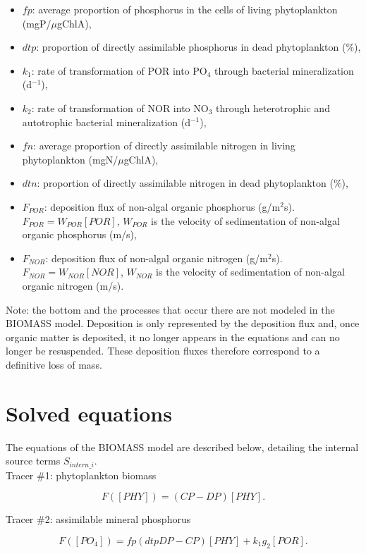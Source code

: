 \begin{itemize}
\item $fp$: average proportion of phosphorus in the cells of living phytoplankton (mgP/$\mu$gChlA),
\item $dtp$: proportion of directly assimilable phosphorus in dead phytoplankton ($\%$),
\item $k_1$: rate of transformation of POR into PO$_4$ through bacterial mineralization (d$^{-1}$),
\item $k_2$: rate of transformation of NOR into NO$_3$ through heterotrophic
  and autotrophic bacterial mineralization (d$^{-1}$),
\item $fn$: average proportion of directly assimilable nitrogen in living phytoplankton (mgN/$\mu$gChlA),
\item $dtn$: proportion of directly assimilable nitrogen in dead phytoplankton ($\%$),
\item $F_{POR}$: deposition flux of non-algal organic phosphorus (g/m$^2$s).
  $F_{POR} = W_{POR} [POR]$, $W_{POR}$ is the velocity of sedimentation of non-algal organic phosphorus (m/s),
\item $F_{NOR}$: deposition flux of non-algal organic nitrogen (g/m$^2$s).
  $F_{NOR} = W_{NOR} [NOR]$, $W_{NOR}$ is the velocity of sedimentation of non-algal organic nitrogen (m/s).
\end{itemize}

Note: the bottom and the processes that occur there are not modeled in the BIOMASS model.
Deposition is only represented by the deposition flux and,
once organic matter is deposited,
it no longer appears in the equations and can no longer be resuspended.
These deposition fluxes therefore correspond to a definitive loss of mass.

\section{Solved equations}

The equations of the BIOMASS model are described below, detailing the internal source terms $S_{intern\_i}$.\\

Tracer $\#$1: phytoplankton biomass

\begin{equation}
  F([PHY]) = (CP-DP) [PHY].
\end{equation}

Tracer $\#$2: assimilable mineral phosphorus

\begin{equation}
  F([PO_4]) = fp(dtp DP - CP) [PHY] + k_1 g_2 [POR].
\end{equation}

